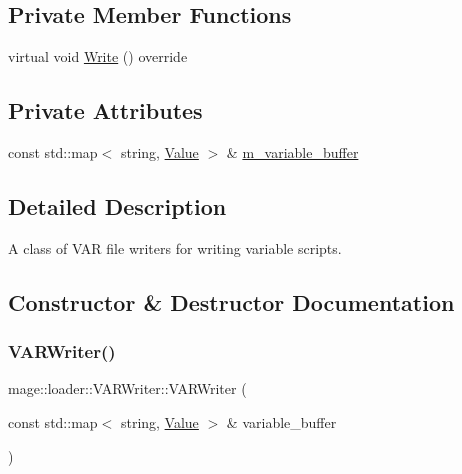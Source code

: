 \subsection*{Private Member Functions}
\begin{DoxyCompactItemize}
\item 
virtual void \hyperlink{classmage_1_1loader_1_1_v_a_r_writer_af2bbf94353f1b4b01aa56e8dd9c89d7f}{Write} () override
\end{DoxyCompactItemize}
\subsection*{Private Attributes}
\begin{DoxyCompactItemize}
\item 
const std\+::map$<$ string, \hyperlink{namespacemage_aa1fe0628487e0706e44efdc62dbdb3a2}{Value} $>$ \& \hyperlink{classmage_1_1loader_1_1_v_a_r_writer_a405d288ded715f12f6f3c8cf29beb6a6}{m\+\_\+variable\+\_\+buffer}
\end{DoxyCompactItemize}


\subsection{Detailed Description}
A class of V\+AR file writers for writing variable scripts. 

\subsection{Constructor \& Destructor Documentation}
\hypertarget{classmage_1_1loader_1_1_v_a_r_writer_af9b9e552dc77446790bbd52390b42582}{}\label{classmage_1_1loader_1_1_v_a_r_writer_af9b9e552dc77446790bbd52390b42582} 
\subsubsection{\texorpdfstring{V\+A\+R\+Writer()}{VARWriter()}\hspace{0.1cm}{\footnotesize\ttfamily [1/3]}}
{\footnotesize\ttfamily mage\+::loader\+::\+V\+A\+R\+Writer\+::\+V\+A\+R\+Writer (\begin{DoxyParamCaption}\item[{const std\+::map$<$ string, \hyperlink{namespacemage_aa1fe0628487e0706e44efdc62dbdb3a2}{Value} $>$ \&}]{variable\+\_\+buffer }\end{DoxyParamCaption})\hspace{0.3cm}{\ttfamily [explicit]}}


